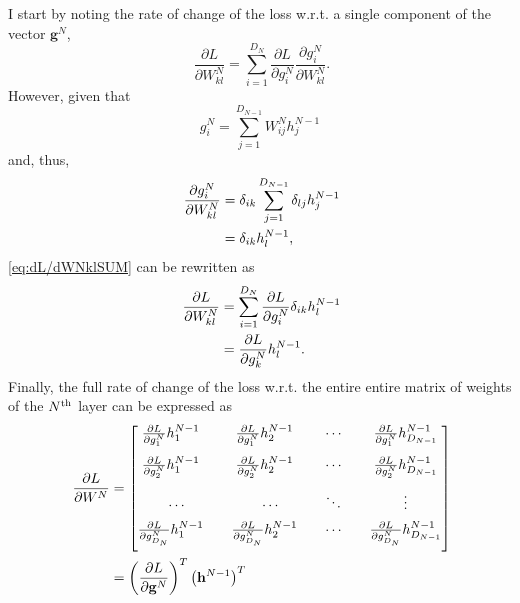 \documentclass{article}
\newcommand{\pc}[0]{\phantom{,}}
\newcommand{\pd}[0]{\phantom{.}}
\begin{document}
I start by noting the rate of change of the loss w.r.t. a single component of the vector $\mathbf{g}^N$,
\begin{equation}
\label{eq:dL/dWNklSUM}
    \pd\frac{\partial L}{\partial W^N_{kl}} = \displaystyle\sum_{i=1}^{D_N}\frac{\partial L}{\partial g^N_i}\frac{\partial g^N_i}{\partial W^N_{kl}}.
\end{equation}
However, given that
\begin{equation}
    g^N_i = \displaystyle\sum_{j=1}^{D_{N-1}}W^N_{ij}h^{N-1}_j
\end{equation}
and, thus,
\begin{align}
    \pc\frac{\partial g^N_i}{\partial W^N_{kl}} &= \delta_{ik}\displaystyle\sum_{j=1}^{D_{N-1}}\delta_{lj}h^{N-1}_j\notag \\
    &= \delta_{ik}h^{N-1}_l,
\end{align}
\cref{eq:dL/dWNklSUM} can be rewritten as
\begin{align}
\label{eq:dL/dWNkl}
    \pd\frac{\partial L}{\partial W^N_{kl}} &= \displaystyle\sum_{i=1}^{D_N}\frac{\partial L}{\partial g^N_i}\delta_{ik}h^{N-1}_l\notag \\
    &= \frac{\partial L}{\partial g^N_k}h^{N-1}_l.
\end{align}
Finally, the full rate of change of the loss w.r.t. the entire entire matrix of weights of the $N\textsuperscript{th}$ layer can be expressed as
\begin{align}
    \label{eq:dL/dWN}
    \pd\frac{\partial L}{\partial W^N} &=
    \begin{bmatrix}
        \frac{\partial L}{\partial g^N_1}h^{N-1}_1\quad &
        \frac{\partial L}{\partial g^N_1}h^{N-1}_2\quad &
        \cdots\quad &
        \frac{\partial L}{\partial g^N_1}h^{N-1}_{D_{N-1}} \\[1em]
        \frac{\partial L}{\partial g^N_2}h^{N-1}_1\quad &
        \frac{\partial L}{\partial g^N_2}h^{N-1}_2\quad &
        \cdots\quad &
        \frac{\partial L}{\partial g^N_2}h^{N-1}_{D_{N-1}} \\[1em]
        \cdots &
        \cdots &
        \ddots\quad &
        \vdots \\[0.5em]
        \frac{\partial L}{\partial g^N_{D_N}}h^{N-1}_1\quad &
        \frac{\partial L}{\partial g^N_{D_N}}h^{N-1}_2\quad &
        \cdots\quad &
        \frac{\partial L}{\partial g^N_{D_N}}h^{N-1}_{D_{N-1}} \\[1em]
    \end{bmatrix}\notag \\
    &= \left(\frac{\partial L}{\partial \mathbf{g}^N}\right)^T\left(\mathbf{h}^{N-1}\right)^T
\end{align}
\end{document}
